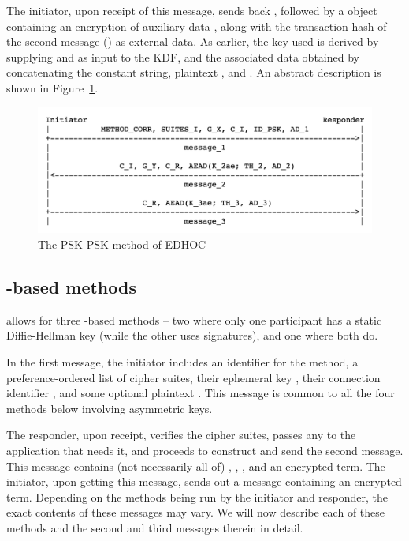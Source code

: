 The initiator, upon receipt of this message, sends back \mCr, followed by a \mCose object containing an \mAead encryption of auxiliary data \mADthree, along with the transaction hash of the second message (\mTHthree) as external data. As earlier, the key used is derived by supplying \mTHthree and \mPRKthree as input to the KDF, and the associated data obtained by concatenating the constant string, plaintext \mhplain, and \mTHthree. An abstract description is shown in Figure~\ref{fig:edhocpsk}.


\begin{figure}[!h]\label{fig:edhocpsk}
\centering
\includegraphics[scale=0.3]{Images/psk.png}
\caption{The PSK-PSK method of EDHOC}
\end{figure}

\subsection{\mStat-based methods}
\mEdhoc allows for three \mStat-based methods -- two where only one participant has a static Diffie-Hellman key (while the other uses signatures), and one where both do. 

In the first message, the initiator includes an identifier for the method, a preference-ordered list of cipher suites, their ephemeral key \mGx, their connection identifier \mCi, and some optional plaintext \mADone. This message is common to all the four methods below involving asymmetric keys. 

The responder, upon receipt, verifies the cipher suites, passes any \mADone to the application that needs it, and proceeds to construct and send the second message. This message contains (not necessarily all of) \mCi, \mGy, \mCr, and an encrypted term. The initiator, upon getting this message, sends out a message containing an encrypted term. Depending on the methods being run by the initiator and responder, the exact contents of these messages may vary. We will now describe each of these methods and the second and third messages therein in detail.


